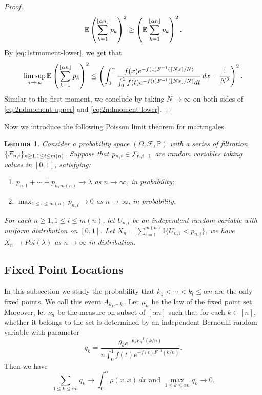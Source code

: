 \documentclass[10pt]{article}
\newtheorem{lem}[thm]{Lemma}
\numberwithin{equation}{section}
\begin{document}
\begin{proof}
\begin{equation}
            \mathbb E\left(\sum_{k=1}^{\lfloor \alpha n \rfloor} p_k \right)^2  \geq \left(\mathbb E\sum_{k=1}^{\lfloor \alpha n \rfloor} p_k \right)^2 .
        \end{equation}
        By \eqref{eq:1stmoment-lower}, we get that
        \begin{equation}\label{eq:2ndmoment-lower}
            \limsup_{n\to \infty} \mathbb E\left(\sum_{k=1}^{\lfloor \alpha n \rfloor} p_k \right)^2  \leq \left( \int_0^\alpha \frac{f(x)e^{-f(x)F^{-1}(\lceil Nx\rceil/N)}}{\int_0^1f(t)e^{-f(t)F^{-1}(\lfloor Nx\rfloor/N)}dt} \,dx  -\frac{1}{N^2}\right)^2.
        \end{equation}
        Similar to the first moment, we conclude by taking $N\to \infty $ on both sides of \eqref{eq:2ndmoment-upper} and \eqref{eq:2ndmoment-lower}.
    \end{proof}

    Now we introduce the following Poisson limit theorem for martingales.

    \begin{lem}
        Consider a probability space $(\Omega,\mathcal F, \mathbb P)$ with a series of filtration $\{{\mathcal{F}}_{n,i}\}_{n\geq 1, 1\leq i\leq m(n)}$. Suppose that $p_{n,i}\in {\mathcal{F}}_{n,i-1}$ are random variables taking values in $[0,1]$, satisfying:
        \begin{enumerate}
            \item $p_{n,1}+\cdots + p_{n,m(n)} \to \lambda$ as $n \to \infty$, in probability;
            \item $\max_{1\leq i\leq m(n)}p_{n,i}\to 0$ as $n \to \infty$, in probability.
        \end{enumerate}
        For each $n\geq 1, 1\leq i\leq m(n)$, let $U_{n,i}$ be an independent random variable with uniform distribution on $[0,1]$. Let  $X_n=\sum_{i=1}^{m(n)} \mathbb I\{U_{n,i}<p_{n,i}\}$, we have $X_n\to Poi(\lambda)$ as $n\to \infty$ in distribution.
    \end{lem}

    \subsection{Fixed Point Locations}
    In this subsection we study the probability that $k_1<\cdots< k_l\le \alpha n$ are the only fixed points. We call this event $A_{k_1,\cdots k_l}$. Let $\mu_n$ be the law of the fixed point set.
    Moreover, let $\nu_n$ be the measure on subset of $[\alpha n]$ such that for each $k\in[n]$, whether it belongs to the set is determined by an independent Bernoulli random variable with parameter
    \[q_k=\frac{\theta_{k}e^{-\theta_{k}F_n^{-1}(k/n)}}{n\int_0^1f(t)e^{-f(t)F^{-1}(k/n)}}.\]
    Then we have
    \begin{equation}\label{eq:q-limit}
        \sum_{1\leq k\leq \alpha n}q_k \to \int_0^\alpha \rho(x,x)\,dx \mbox{ and }\max_{1\leq k\leq \alpha n}q_k \to 0.
    \end{equation}
\end{document}
